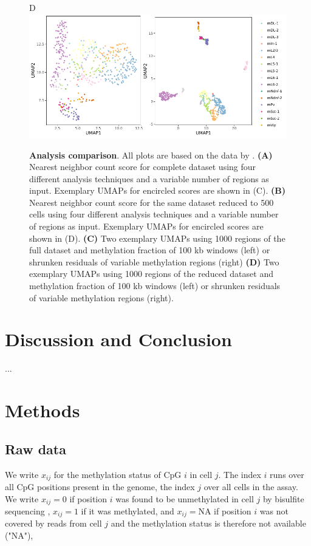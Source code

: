 \documentclass[twocolumn,10pt]{article}
\begin{document}
\begin{figure}[!htp]
	D\\
	\hspace{.39cm}\includegraphics[width=\columnwidth]{part_leonie_git/leonie_plots/UMAP_reduceddataset.pdf}
	\caption{\small \textbf{Analysis comparison}. All plots are based on the data by \citealp{Luo_2017}. \textbf{(A)} Nearest neighbor count score for complete dataset using four different analysis techniques and a variable number of regions as input. Exemplary UMAPs for encircled scores are shown in (C). \textbf{(B)} Nearest neighbor count score for the same dataset reduced to 500 cells using four different analysis techniques and a variable number of regions as input. Exemplary UMAPs for encircled scores are shown in (D). \textbf{(C)} Two exemplary UMAPs using 1000 regions of the full dataset and methylation fraction of 100 kb windows (left) or shrunken residuals of variable methylation regions (right) \textbf{(D)} Two exemplary UMAPs using 1000 regions of the reduced dataset and methylation fraction of 100 kb windows (left) or shrunken residuals of variable methylation regions (right).}
	\label{figure:score}
\end{figure}

\section{Discussion and Conclusion}

...


\section{Methods}

\subsection{Raw data}

We write $x_{ij}$ for the methylation status of CpG $i$ in cell $j$. The index $i$ runs over all CpG positions present in the genome, the index $j$ over all cells in the assay. We write $x_{ij}=0$ if position $i$ was found to be unmethylated in cell $j$ by bisulfite sequencing , $x_{ij}=1$ if it was methylated, and $x_{ij}=\text{NA}$ if position $i$ was not covered by reads from cell $j$ and the methylation status is therefore not available ("NA"),
\end{document}
